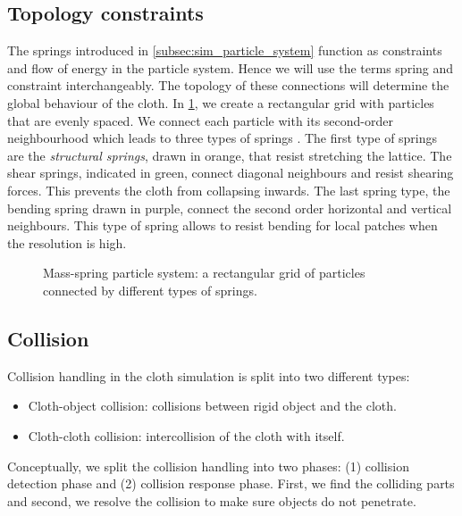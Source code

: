 \documentclass[\home/main.tex]{subfiles}
\begin{document}
\subsection{Topology constraints} \label{subsec:sim_topology_cloth}
The springs introduced in \cref{subsec:sim_particle_system} function as constraints and flow of energy in the particle system. Hence we will use the terms spring and constraint interchangeably. The topology of these connections will determine the global behaviour of the cloth. In \cref{fig:sim_topology_cloth_springs}, we create a rectangular grid with particles that are evenly spaced. We connect each particle with its second-order neighbourhood which leads to three types of springs \autocite{Provot1995DeformationCI}. The first type of springs are the \emph{structural springs}, drawn in orange, that resist stretching the lattice.
The shear springs, indicated in green, connect diagonal neighbours and resist shearing forces. This prevents the cloth from collapsing inwards.
The last spring type, the bending spring drawn in purple, connect the second order horizontal and vertical neighbours. This type of spring allows to resist bending for local patches when the resolution is high.

\begin{figure}[htb]
    \centering
    
    \caption[Mass-spring particle system.]{Mass-spring particle system: a rectangular grid of particles connected by different types of springs.}
    \label{fig:sim_topology_cloth_springs}
\end{figure}

\subsection{Collision}
Collision handling in the cloth simulation is split into two different types:
\begin{itemize}
    \item Cloth-object collision: collisions between rigid object and the cloth.
    \item Cloth-cloth collision: intercollision of the cloth with itself.
\end{itemize}

Conceptually, we split the collision handling into two phases: (1) collision detection phase and (2) collision response phase. First, we find the colliding parts and second, we resolve the collision to make sure objects do not penetrate.
\end{document}
